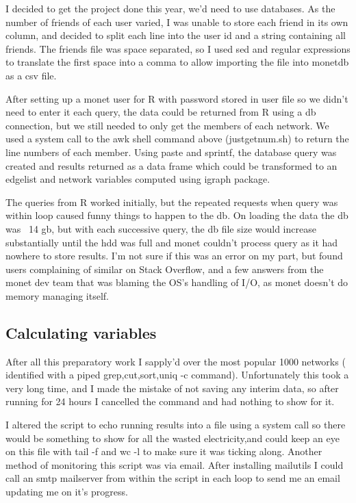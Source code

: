 \documentclass[12pt]{article}
\begin{document}
		I decided to get the project done this year, we'd need to use databases.
		As the number of friends of each user varied, I was unable to store each friend in its own column, and decided to split each line into the user id and a string containing all friends.
		The friends file was space separated, so I used sed and regular expressions to translate the first space into a comma to allow importing the file into monetdb as a csv file.


		After setting up a monet user for R with password stored in user file so we didn't need to enter it each query, the data could be returned from R using a db connection, but we still needed to only get the members of each network.
		We used a system call to the awk shell command above (justgetnum.sh) to return the line numbers of each member.
		Using paste and sprintf, the database query was created and results returned as a data frame which could be transformed to an edgelist and network variables computed using igraph package.


		The queries from R worked initially, but the repeated requests when query was within loop caused funny things to happen to the db.
		On loading the data the db was ~14 gb, but with each successive query, the db file size would increase substantially until the hdd was full and monet couldn't process query as it had nowhere to store results.
		I'm not sure if this was an error on my part, but found users complaining of similar on Stack Overflow, and a few answers from the monet dev team that was blaming the OS's handling of I/O, as monet doesn't do memory managing itself. 



		\subsection{Calculating variables}
		After all this preparatory work I sapply'd over the most popular 1000 networks ( identified with a piped grep,cut,sort,uniq -c command).
		Unfortunately this took a very long time, and I made the mistake of not saving any interim data, so after running for 24 hours I cancelled the command and had nothing to show for it.


		I altered the script to echo running results into a file using a system call so there would be something to show for all the wasted electricity,and could keep an eye on this file with tail -f and wc -l to make sure it was ticking along.
		Another method of monitoring this script was via email.
		After installing mailutils I could call an smtp mailserver from within the script in each loop to send me an email updating me on it's progress.
\end{document}
